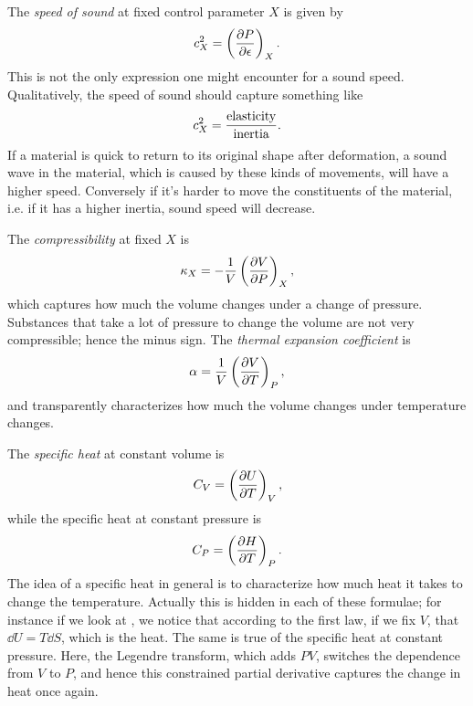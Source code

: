 The {\it speed of sound} at fixed control parameter $X$
is given by
\begin{equation}
  c_X^2=\left(\pdv{P}{\epsilon}\right)_{X}.
\end{equation}
This is not the only expression one might encounter for a sound speed.
Qualitatively, the speed of sound should capture something like
\begin{equation}
  c_X^2=\frac{{\rm elasticity}}{{\rm inertia}}.
\end{equation}
If a material is quick to return to its original shape after deformation, a sound
wave in the material, which is caused by these kinds of movements, will have a
higher speed. Conversely if it's harder to move the constituents of the
material, i.e. if it has a higher inertia, sound speed will decrease.


The {\it compressibility} at fixed $X$ is
\begin{equation}
  \kappa_X=-\frac{1}{V}\left(\pdv{V}{P}\right)_{X},
\end{equation}
which captures how much the volume changes under a change of pressure.
Substances that take a lot of pressure to change the volume are not
very compressible; hence the minus sign.
The {\it thermal expansion coefficient}
is
\begin{equation}
  \alpha=\frac{1}{V}\left(\pdv{V}{T}\right)_{P},
\end{equation}
and transparently characterizes how much the volume changes under temperature
changes.

The {\it specific heat} at constant volume is
\begin{equation}\label{eq:CV}
  C_V=\left(\pdv{U}{T}\right)_{V},
\end{equation}
while the specific heat at constant pressure is
\begin{equation}
  C_P=\left(\pdv{H}{T}\right)_{P}.
\end{equation}
The idea of a specific heat in general is to characterize how much heat
it takes to change the temperature. Actually this is hidden in each of
these formulae; for instance if we look at , we notice
that according to the first law, if we fix $V$, that
$\dd U=T\dd{S}$, which is the heat. The same is true of the specific heat
at constant pressure. Here, the Legendre transform, which adds $PV$,
switches the dependence from $V$ to $P$, and hence this constrained
partial derivative captures the change in heat once again.

